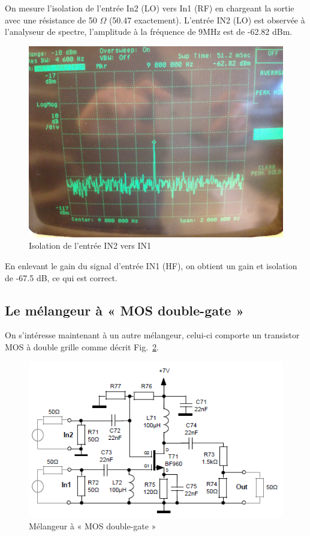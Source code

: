 \documentclass{article}
\begin{document}

On mesure l'isolation de l'entrée In2 (LO) vers In1 (RF) en chargeant la sortie avec une résistance de 50 $\Omega$ (50.47 exactement).
L'entrée IN2 (LO) est observée à l'analyseur de spectre, l'amplitude à la fréquence de 9MHz est de -62.82 dBm.

\begin{figure}[h!]
	\centering
	\includegraphics[width=.7\textwidth]{9_3_5}
	\caption{Isolation de l'entrée IN2 vers IN1}
	\label{fig:9_3_5}
\end{figure}

En enlevant le gain du signal d'entrée IN1 (HF), on obtient un gain et isolation de -67.5 dB, ce qui est correct.


\subsection{Le mélangeur à « MOS double-gate »}

On s'intéresse maintenant à un autre mélangeur, celui-ci comporte un transistor MOS à double grille comme décrit Fig.~\ref{fig:schema_melangeur_mosdoublegate}.\\
\begin{figure}[h!]
	\centering
	\includegraphics[width=.7\textwidth]{schema_melangeur_mosdoublegate}
	\caption{Mélangeur à « MOS double-gate »}
	\label{fig:schema_melangeur_mosdoublegate}
\end{figure}
\end{document}
